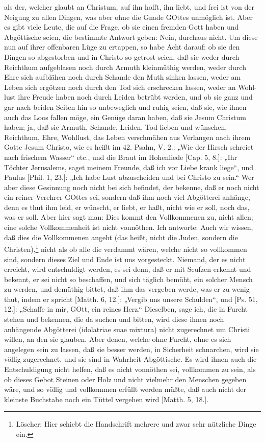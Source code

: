 als der, welcher glaubt an Christum, auf ihn hofft, ihn liebt, und frei ist von der Neigung zu allen Dingen, was aber ohne die Gnade GOttes unmöglich ist. Aber es gibt viele Leute, die auf die Frage, ob sie einen fremden Gott haben und Abgöttische seien, die bestimmte Antwort geben: Nein, durchaus nicht. Um diese nun auf ihrer offenbaren Lüge zu ertappen, so habe Acht darauf: ob sie den Dingen so abgestorben und in Christo so getrost seien, daß sie weder durch Reichthum aufgeblasen noch durch Armuth kleinmüthig werden, weder durch Ehre sich aufblähen noch durch Schande den Muth sinken lassen, weder am Leben sich ergötzen noch durch den Tod sich erschrecken lassen, weder an Wohl-lust ihre Freude haben noch durch Leiden betrübt werden, und ob sie ganz und gar nach beiden Seiten hin so unbeweglich und ruhig seien, daß sie, wie ihnen auch das Loos fallen möge, ein Genüge daran haben, daß sie Jesum Christum haben; ja, daß sie Armuth, Schande, Leiden, Tod lieben und wünschen, Reichthum, Ehre, Wohllust, das Leben verschmähen aus Verlangen nach ihrem Gotte Jesum Christo, wie es heißt im 42. Psalm, V. 2.: „Wie der Hirsch schreiet nach frischem Wasser“ etc., und die Braut im Hohenliede [Cap. 5, 8.]: „Ihr Töchter Jerusalems, saget meinem Freunde, daß ich vor Liebe krank liege“, und Paulus [Phil. 1, 23.]: „Ich habe Lust abzuscheiden und bei Christo zu sein.“ Wer aber diese Gesinnung noch nicht bei sich befindet, der bekenne, daß er noch nicht ein reiner Verehrer GOttes sei, sondern daß ihm noch viel Abgötterei anhänge, denn es thut ihm leid, er wünscht, er liebt, er haßt, nicht wie er soll, noch das, was er soll. Aber hier sagt man: Dies kommt den Vollkommenen zu, nicht allen; eine solche Vollkommenheit ist nicht vonnöthen. Ich antworte: Auch wir wissen, daß dies die Vollkommenen angeht (das heißt, nicht die Juden, sondern die Christen),\footnote{Löscher: Hier schiebt die Handschrift mehrere und zwar sehr nützliche Dinge ein.} nicht als ob alle die verdammt wären, welche nicht so vollkommen sind, sondern dieses Ziel und Ende ist uns vorgesteckt. Niemand, der es nicht erreicht, wird entschuldigt werden, es sei denn, daß er mit Seufzen erkennt und bekennt, er sei nicht so beschaffen, und sich täglich bemüht, ein solcher Mensch zu werden, und demüthig bittet, daß ihm das vergeben werde, was er zu wenig thut, indem er spricht [Matth. 6, 12.]: „Vergib uns unsere Schulden“, und [Ps. 51, 12.]: „Schaffe in mir, GOtt, ein reines Herz.“ Dieselben, sage ich, die in Furcht stehen und bekennen, die da suchen und bitten, wird diese ihnen noch anhängende Abgötterei (idolatriae suae mixtura) nicht zugerechnet um Christi willen, an den sie glauben. Aber denen, welche ohne Furcht, ohne es sich angelegen sein zu lassen, daß sie besser werden, in Sicherheit schnarchen, wird sie völlig zugerechnet, und sie sind in Wahrheit Abgöttische. Es wird ihnen auch die Entschuldigung nicht helfen, daß es nicht vonnöthen sei, vollkommen zu sein, als ob dieses Gebot Steinen oder Holz und nicht vielmehr den Menschen gegeben wäre, und so völlig und vollkommen erfüllt werden müßte, daß auch nicht der kleinste Buchstabe noch ein Tüttel vergehen wird [Matth. 5, 18.].

